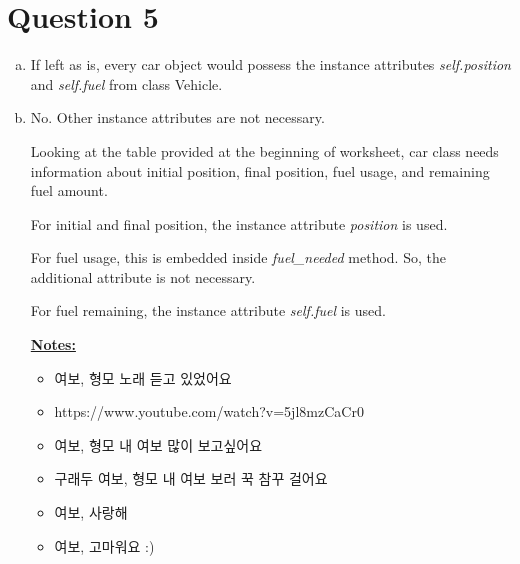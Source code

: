 \documentclass[12pt]{article}
\begin{document}
\section*{Question 5}
\begin{enumerate}[a.]
    \item If left as is, every car object would possess the instance attributes
    \textit{self.position} and \textit{self.fuel} from class Vehicle.

    \item No. Other instance attributes are not necessary.

    \bigskip

    Looking at the table provided at the beginning of worksheet, car class needs
    information about initial position, final position, fuel usage, and remaining fuel amount.

    \bigskip

    For initial and final position, the instance attribute \textit{position} is used.

    \bigskip

    For fuel usage, this is embedded inside \textit{fuel\_needed} method. So,
    the additional attribute is not necessary.

    \bigskip

    For fuel remaining, the instance attribute \textit{self.fuel} is used.

    \bigskip

    \underline{\textbf{Notes:}}

    \begin{itemize}
        \item 여보, 형모 노래 듣고 있었어요
        \item https://www.youtube.com/watch?v=5jl8mzCaCr0
        \item 여보, 형모 내 여보 많이 보고싶어요
        \item 구래두 여보, 형모 내 여보 보러 꾹 참꾸 걸어요
        \item 여보, 사랑해
        \item 여보, 고마워요 :)
    \end{itemize}

\end{enumerate}
\end{document}
